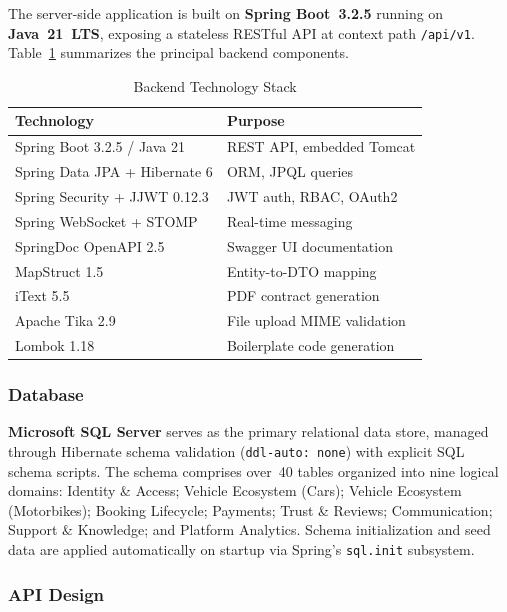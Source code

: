 The server-side application is built on \textbf{Spring Boot~3.2.5}
running on \textbf{Java~21~LTS}, exposing a stateless RESTful API at
context path \texttt{/api/v1}. Table~\ref{tab:backend_stack} summarizes
the principal backend components.

\begin{table}[htbp]
\centering
\caption{Backend Technology Stack}
\label{tab:backend_stack}
\begin{tabular}{ll}
\toprule
\textbf{Technology} & \textbf{Purpose} \\
\midrule
Spring Boot 3.2.5 / Java 21  & REST API, embedded Tomcat \\
Spring Data JPA + Hibernate 6 & ORM, JPQL queries \\
Spring Security + JJWT 0.12.3 & JWT auth, RBAC, OAuth2 \\
Spring WebSocket + STOMP      & Real-time messaging \\
SpringDoc OpenAPI 2.5         & Swagger UI documentation \\
MapStruct 1.5                 & Entity-to-DTO mapping \\
iText 5.5                     & PDF contract generation \\
Apache Tika 2.9               & File upload MIME validation \\
Lombok 1.18                   & Boilerplate code generation \\
\bottomrule
\end{tabular}
\end{table}

\subsubsection{Database}

\textbf{Microsoft SQL Server} serves as the primary relational data
store, managed through Hibernate schema validation (\texttt{ddl-auto:
none}) with explicit SQL schema scripts. The schema comprises over~40
tables organized into nine logical domains: Identity \& Access; Vehicle
Ecosystem (Cars); Vehicle Ecosystem (Motorbikes); Booking Lifecycle;
Payments; Trust \& Reviews; Communication; Support \& Knowledge; and
Platform Analytics. Schema initialization and seed data are applied
automatically on startup via Spring's \texttt{sql.init} subsystem.

\subsubsection{API Design}

